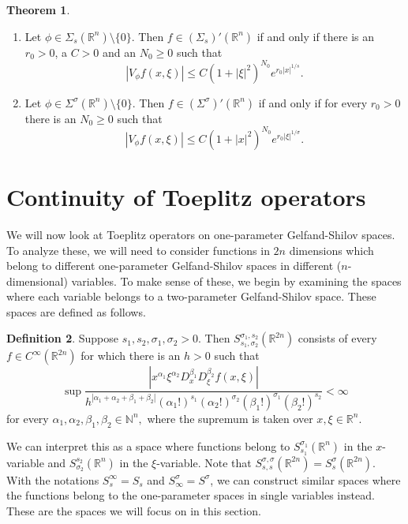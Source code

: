 \documentclass[11pt,a4paper,reqno]{amsart}
\numberwithin{equation}{section}
\theoremstyle{definition}
\newtheorem{thm}{Theorem}[section]
\theoremstyle{definition}
\newtheorem{definition}[thm]{Definition}
\begin{document}
\begin{thm}
\begin{enumerate}[label=(\roman*)]
    \item Let $\phi\in \Sigma_s(\mathbb{R}^n)\setminus\{0\}$. Then $f\in(\Sigma_s)'(\mathbb{R}^n)$ if and only if there is an $r_0>0$, a $C>0$ and an $N_0\geq 0$ such that
    \begin{equation*}
        |V_\phi f(x,\xi)| \leq C(1+|\xi|^2)^{N_0} e^{r_0|x|^{1/s}}.
    \end{equation*}
     \item Let $\phi\in \Sigma^\sigma(\mathbb{R}^n)\setminus\{0\}$. Then $f\in(\Sigma^\sigma)'(\mathbb{R}^n)$ if and only if for every $r_0>0$ there is an $N_0\geq 0$ such that
    \begin{equation*}
        |V_\phi f(x,\xi)| \leq C(1+|x|^2)^{N_0} e^{r_0|\xi|^{1/\sigma}}.
    \end{equation*}
\end{enumerate}
\end{thm}
\section{Continuity of Toeplitz operators}\label{sec:top}
We will now look at Toeplitz operators on one-parameter Gelfand-Shilov spaces. To analyze these, we will need to consider functions in $2n$ dimensions which belong to different  one-parameter Gelfand-Shilov spaces in different ($n$-dimensional) variables. To make sense of these, we begin by examining the spaces where each variable belongs to a two-parameter Gelfand-Shilov space. These spaces are defined as follows.
    \begin{definition}
     Suppose $s_1,s_2,\sigma_1,\sigma_2 > 0$. Then $S_{s_1,\sigma_2}^{\sigma_1,s_2}(\mathbb{R}^{2 n})$ consists of every $f\in C^{\infty}(\mathbb{R}^{2n})$ for which there is an $h>0$ such that
     \begin{equation*}
         \sup \dfrac{\left| x^{\alpha_1} \xi^{\alpha_2} D_x^{\beta_1} D_\xi^{\beta_2} f(x,\xi) \right|}{h^{|\alpha_1 + \alpha_2 + \beta_1 + \beta_2|} (\alpha_1!)^{s_1} (\alpha_2!)^{\sigma_2} (\beta_1!)^{\sigma_1} (\beta_2!)^{s_2}} < \infty 
     \end{equation*}
    for every $\alpha_1,\alpha_2,\beta_1,\beta_2\in \mathbb{N}^n,$ where the supremum is taken over $x,\xi\in\mathbb{R}^n$.
    \end{definition}
    We can interpret this as a space where functions belong to $S_{s_1}^{\sigma_1}(\mathbb{R}^{n})$ in the $x$-variable and $S_{\sigma_2}^{s_2}(\mathbb{R}^{n})$ in the $\xi$-variable. Note that $S_{s,s}^{\sigma,\sigma}(\mathbb{R}^{2 n}) = S_s^\sigma(\mathbb{R}^{2 n})$. With the notations $S_{s}^\infty = S_s$ and $S_\infty^\sigma = S^\sigma$, we can construct similar spaces where the functions belong to the one-parameter spaces in single variables instead. These are the spaces we will focus on in this section.
    
\end{document}
